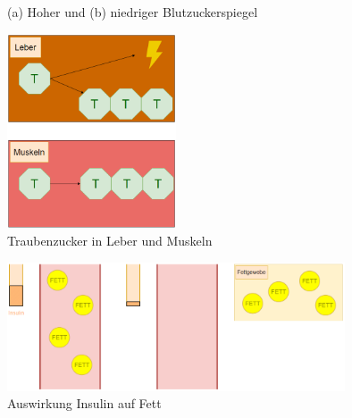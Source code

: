 \documentclass[xcolor=dvipsnames]{beamer}
\begin{document}
\begin{frame}[allowframebreaks]
        \begin{figure}
            \centering
            \caption{(a) Hoher und (b) niedriger Blutzuckerspiegel}
        \end{figure}

        \framebreak

        \begin{figure}
            \centering
            \includegraphics[width=5cm]{../images/leber_1.png}
            \caption{Traubenzucker in Leber und Muskeln}
        \end{figure}

        \framebreak

        \begin{figure}
            \centering
            \includegraphics[width=10cm]{../images/fettgewebe.png}
            \caption{Auswirkung Insulin auf Fett}
        \end{figure}


\end{frame}
\end{document}
